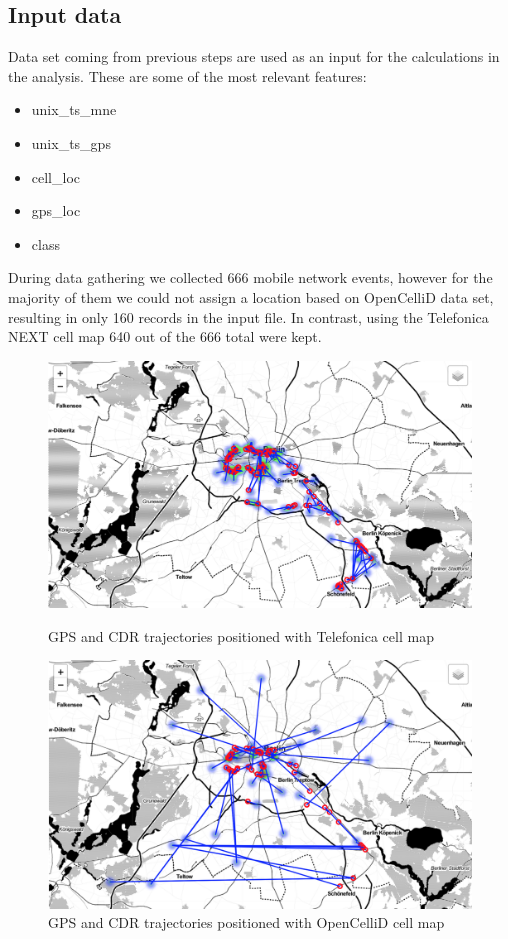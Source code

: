 \subsection{Input data}
Data set coming from previous steps are used as an input for the calculations in the analysis. These are some of the most relevant features:
\begin{itemize}
    \item unix\_ts\_mne
    \item unix\_ts\_gps
    \item cell\_loc
    \item gps\_loc
    \item class
\end{itemize}

During data gathering we collected 666 mobile network events, however for the majority of them we could not assign a location based on OpenCelliD data set, resulting in only 160 records in the input file. In contrast, using the Telefonica NEXT cell map 640 out of the 666 total were kept.

\begin{figure}[h]
    \begin{minipage}[b]{0.5\textwidth}
        \includegraphics[width=\textwidth]{images/tefnext_traj.png}
        \caption{GPS and CDR trajectories positioned with Telefonica cell map}
        \label{fig:tefnext_avg_threshold}
    
        \includegraphics[width=\textwidth]{images/opencellid_traj.png}
        \caption{GPS and CDR trajectories positioned with OpenCelliD cell map}
        \label{fig:opencellid_avg_threshold}
    \end{minipage}\qquad
\end{figure}


